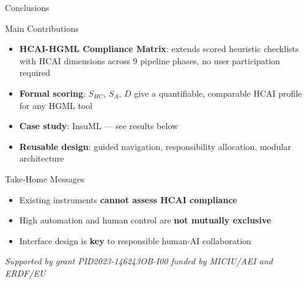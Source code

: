 \documentclass[aspectratio=169,10pt,english,dvipsnames]{beamer}
\begin{document}
\begin{frame}{Conclusions} \small
  \begin{block}{Main Contributions}
    \begin{itemize}\scriptsize
      \item \textbf{HCAI-HGML Compliance Matrix}: extends scored heuristic
            checklists with HCAI dimensions across 9 pipeline phases,
            no user participation required
      \item \textbf{Formal scoring}: $S_{HC}$, $S_A$, $D$ give a
            quantifiable, comparable HCAI profile for any HGML tool
      \item \textbf{Case study}: InsuML --- see results below
      \item \textbf{Reusable design}: guided navigation,
            responsibility allocation, modular architecture
    \end{itemize}
  \end{block}
  \vspace{3mm}
  \centering
  \vspace{3mm}
  \begin{exampleblock}{Take-Home Messages}
    \scriptsize
    \begin{itemize}
      \item Existing instruments \textbf{cannot assess HCAI compliance}
      \item High automation and human control are \textbf{not mutually exclusive}
      \item Interface design is \textbf{key} to responsible human-AI collaboration
    \end{itemize}
  \end{exampleblock}
\end{frame}

\begin{frame}
  \titlepage
  \vspace{-4mm}
  \begin{center}
    \scriptsize
    \textit{Supported by grant PID2023-146243OB-I00 funded by MICIU/AEI and ERDF/EU}
  \end{center}
\end{frame}
\end{document}
